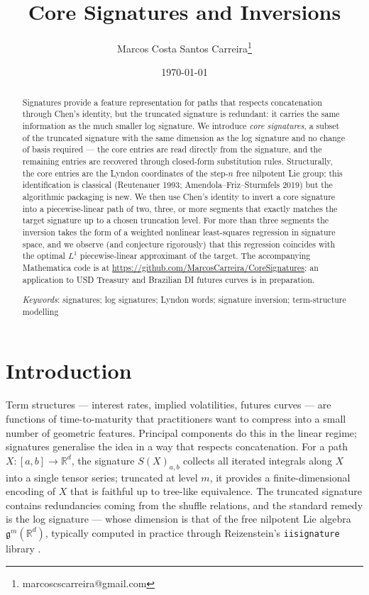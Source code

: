 \documentclass[11pt,english]{article}
\begin{document}
\title{Core Signatures and Inversions}
\author{Marcos Costa Santos Carreira\thanks{marcoscscarreira@gmail.com}}
\date{\today}
\maketitle

\begin{abstract}
Signatures provide a feature representation for paths that respects
concatenation through Chen's identity, but the truncated signature
is redundant: it carries the same information as the much smaller
log signature. We introduce \emph{core signatures}, a subset of the
truncated signature with the same dimension as the log signature and
no change of basis required --- the core entries are read directly
from the signature, and the remaining entries are recovered through
closed-form substitution rules. Structurally, the core entries are
the Lyndon coordinates of the step-$n$ free nilpotent Lie group; this
identification is classical (Reutenauer 1993; Amendola--Friz--Sturmfels
2019) but the algorithmic packaging is new. We then use Chen's identity
to invert a core signature into a piecewise-linear path of two, three,
or more segments that exactly matches the target signature up to a
chosen truncation level. For more than three segments the inversion
takes the form of a weighted nonlinear least-squares regression in
signature space, and we observe (and conjecture rigorously) that
this regression coincides with the optimal $L^{1}$ piecewise-linear
approximant of the target. The accompanying Mathematica code is at
\url{https://github.com/MarcosCarreira/CoreSignatures}; an application
to USD Treasury and Brazilian DI futures curves is in preparation.

\medskip{}
\textit{Keywords}: signatures; log signatures; Lyndon words; signature
inversion; term-structure modelling
\end{abstract}

\section{Introduction}

Term structures --- interest rates, implied volatilities, futures curves
--- are functions of time-to-maturity that practitioners want to compress
into a small number of geometric features. Principal components do
this in the linear regime; signatures generalise the idea in a way
that respects concatenation. For a path $X:[a,b]\to\mathbb{R}^{d}$,
the signature $S(X)_{a,b}$ collects all iterated integrals along
$X$ into a single tensor series; truncated at level $m$, it provides
a finite-dimensional encoding of $X$ that is faithful up to tree-like
equivalence. The truncated signature contains redundancies coming
from the shuffle relations, and the standard remedy is the log signature
--- whose dimension is that of the free nilpotent Lie algebra $\mathfrak{g}^{m}(\mathbb{R}^{d})$,
typically computed in practice through Reizenstein's \texttt{iisignature}
library \cite{iisignature,iisignature 1004,log signatures}.
\end{document}
